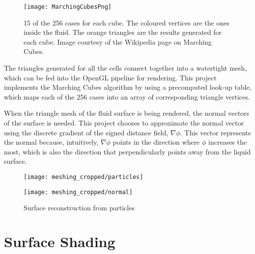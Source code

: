 \begin{figure}[H]
    \centering
    \texttt{[image: MarchingCubesPng]}
    \caption{15 of the 256 cases for each cube. The coloured vertices are the ones inside the fluid. The orange triangles are the results generated for each cube. Image courtesy of the Wikipedia page on Marching Cubes. }
    \label{figure marching cubes}
\end{figure}

The triangles generated for all the cells connect together into a watertight mesh, which can be fed into the OpenGL pipeline for rendering. This project implements the Marching Cubes algorithm by using a precomputed look-up table, which maps each of the 256 cases into an array of corresponding triangle vertices.

When the triangle mesh of the fluid surface is being rendered, the normal vectors of the surface is needed. This project chooses to approximate the normal vector using the discrete gradient of the signed distance field, $\nabla \phi$. This vector represents the normal because, intuitively, $\nabla \phi$ points in the direction where $\phi$ increases the most, which is also the direction that perpendicularly points away from the liquid surface.



\begin{figure}[H]
    \centering
    
    \begin{minipage}[t]{.49\linewidth}
        \centering
        \vspace{0pt}
        \texttt{[image: meshing\_cropped/particles]}
    \end{minipage}
    \begin{minipage}[t]{.49\linewidth}
        \centering
        \vspace{0pt}
        \texttt{[image: meshing\_cropped/normal]}
    \end{minipage}
    
    \caption{Surface reconstruction from particles}
    \label{figure surface reconstruction}
\end{figure}




\section{Surface Shading}

